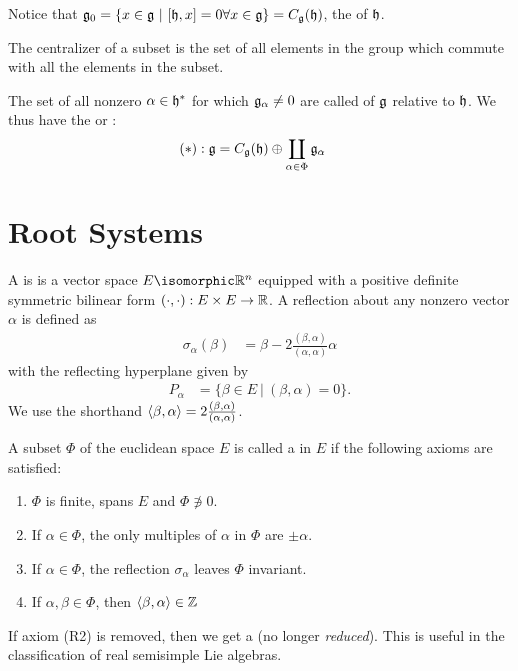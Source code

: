 Notice that $\LieG_0 = \{x\in\LieG\ |\ [\LieH,x] = 0 \forall x\in\LieG\} = C_\LieG(\LieH)$, the  of $\mathfrak{h}$. 
\begin{insight}
    The centralizer of a subset is the set of all elements in the group which commute with all the elements in the subset.
\end{insight}

The set of all nonzero $\alpha\in\mathfrak{h}^*$ for which $\mathfrak{g}_\alpha \neq 0$ are called  of $\mathfrak{g}$ relative to $\mathfrak{h}$. We thus have the  or : 
\begin{align}
    (*): \mathfrak{g} &= C_{\mathfrak{g}}(\mathfrak{h}) \oplus \coprod_{\alpha\in\Phi} \mathfrak{g}_\alpha
\end{align}

\chapter{Root Systems}
\label{cha:root_systems}

A  is is a vector space $E\isomorphic \RR^n$ equipped with a positive definite symmetric bilinear form $(\cdot,\cdot): E\times E \to \mathbb{R}$. A reflection about any nonzero vector $\alpha$ is defined as
\begin{align}
    \sigma_\alpha(\beta) &= \beta - 2 \frac{(\beta,\alpha)}{(\alpha,\alpha)} \alpha
\end{align}
with the reflecting hyperplane given by
\begin{align}
    P_\alpha &= \{\beta\in E \ |\ (\beta,\alpha)=0\}.
\end{align}
We use the shorthand $\langle\beta,\alpha\rangle=2 \frac{(\beta,\alpha)}{(\alpha,\alpha)}$.

A subset $\Phi$ of the euclidean space $E$ is called a  in $E$ if the following axioms are satisfied:
\begin{enumerate}[(R1)]
    \makethislistcompact
    \item $\Phi$ is finite, spans $E$ and $\Phi\not\ni 0$.
    \item If $\alpha\in \Phi$, the only multiples of $\alpha$ in $\Phi$ are $\pm \alpha$.
    \item If $\alpha\in\Phi$, the reflection $\sigma_\alpha$ leaves $\Phi$ invariant.
    \item If $\alpha,\beta\in \Phi$, then $\langle\beta,\alpha\rangle\in \mathbb{Z}$
\end{enumerate}

\begin{insight}
    If axiom (R2) is removed, then we get a  (no longer \emph{reduced}). This is useful in the classification of real semisimple Lie algebras.
\end{insight}

